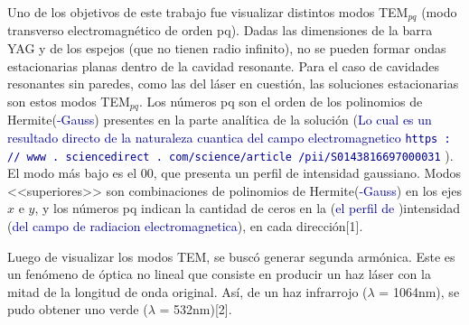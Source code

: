\documentclass[10pt, a4paper]{article}%
\begin{document}
\begin{multicols}{2}
Uno de los objetivos de este trabajo fue visualizar distintos modos TEM$_{pq}$ (modo transverso electromagnético de orden pq). Dadas las dimensiones de la barra YAG y de los espejos (que no tienen radio infinito), no se pueden formar ondas estacionarias planas dentro de la cavidad resonante. Para el caso de cavidades resonantes sin paredes, como las del láser en cuestión, las soluciones estacionarias son estos modos TEM$_{pq}$. Los números pq son el orden de los polinomios de Hermite(\textcolor{DarkBlue}{-Gauss}) presentes en la parte analítica de la solución (\textcolor{DarkBlue}{Lo cual es un resultado directo de la naturaleza cuantica del campo electromagnetico \texttt{https : // www . sciencedirect . com/science/article /pii/S0143816697000031} }). El modo más bajo es el 00, que presenta un perfil de intensidad gaussiano. Modos <<superiores>> son combinaciones de polinomios de Hermite(\textcolor{DarkBlue}{-Gauss}) en los ejes $x$ e $y$, y los números pq indican la cantidad de ceros en la (\textcolor{DarkBlue}{el perfil de })intensidad (\textcolor{DarkBlue}{del campo de radiacion electromagnetica}), en cada dirección[1].

Luego de visualizar los modos TEM, se buscó generar segunda armónica. Este es un fenómeno de óptica no lineal que consiste en producir un haz láser con la mitad de la longitud de onda original. Así, de un haz infrarrojo ($\lambda$ = 1064nm), se pudo obtener uno verde ($\lambda$ = 532nm)[2].







\end{multicols}
\end{document}
